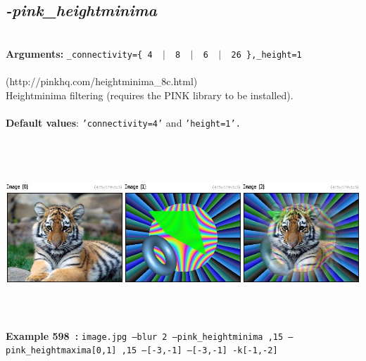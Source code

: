 \documentclass[a4paper,11pt,twoside]{book}
\begin{document}
\subsection{\emph{-pink\_heightminima} }\vspace*{-0.5em}
~\\\textbf{Arguments: } 
{\small \texttt{\_connectivity=\{ 4 ~$|$~ 8 ~$|$~ 6 ~$|$~ 26 \},\_height=1}}\\~\\
(http://pinkhq.com/heightminima\_8c.html)
~\\Heightminima filtering (requires the PINK library to be installed).
~\\~\\\textbf{Default values}: {\small \texttt{'connectivity=4'} and \texttt{'height=1'.}}
\begin{center}\includegraphics[keepaspectratio=true,height=7cm,width=\textwidth]{img/gmic_def598.jpg}\\
{\footnotesize \textbf{Example 598~:} \texttt{image.jpg --blur 2 --pink\_heightminima ,15 --pink\_heightmaxima[0,1] ,15 --[-3,-1] --[-3,-1] -k[-1,-2]}}
\end{center}
\end{document}
